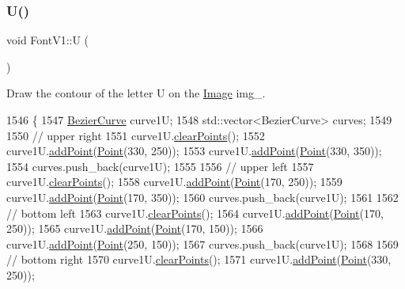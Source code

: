 \subsubsection{\texorpdfstring{U()}{U()}}
{\footnotesize\ttfamily void Font\+V1\+::U (\begin{DoxyParamCaption}{ }\end{DoxyParamCaption})}



Draw the contour of the letter U on the \mbox{\hyperlink{class_image}{Image}} img\+\_\+. 


\begin{DoxyCode}
1546                \{
1547     \mbox{\hyperlink{class_bezier_curve}{BezierCurve}} curve1U;
1548     std::vector<BezierCurve> curves;
1549 
1550     \textcolor{comment}{// upper right}
1551     curve1U.\mbox{\hyperlink{class_bezier_curve_a0ba8ce66d5af5971ae6a1b506029728e}{clearPoints}}();
1552     curve1U.\mbox{\hyperlink{class_bezier_curve_a38d16c18b36ae45619b05e26e226cf34}{addPoint}}(\mbox{\hyperlink{class_point}{Point}}(330, 250));
1553     curve1U.\mbox{\hyperlink{class_bezier_curve_a38d16c18b36ae45619b05e26e226cf34}{addPoint}}(\mbox{\hyperlink{class_point}{Point}}(330, 350));
1554     curves.push\_back(curve1U);
1555 
1556     \textcolor{comment}{// upper left}
1557     curve1U.\mbox{\hyperlink{class_bezier_curve_a0ba8ce66d5af5971ae6a1b506029728e}{clearPoints}}();
1558     curve1U.\mbox{\hyperlink{class_bezier_curve_a38d16c18b36ae45619b05e26e226cf34}{addPoint}}(\mbox{\hyperlink{class_point}{Point}}(170, 250));
1559     curve1U.\mbox{\hyperlink{class_bezier_curve_a38d16c18b36ae45619b05e26e226cf34}{addPoint}}(\mbox{\hyperlink{class_point}{Point}}(170, 350));
1560     curves.push\_back(curve1U);
1561 
1562     \textcolor{comment}{// bottom left}
1563     curve1U.\mbox{\hyperlink{class_bezier_curve_a0ba8ce66d5af5971ae6a1b506029728e}{clearPoints}}();
1564     curve1U.\mbox{\hyperlink{class_bezier_curve_a38d16c18b36ae45619b05e26e226cf34}{addPoint}}(\mbox{\hyperlink{class_point}{Point}}(170, 250));
1565     curve1U.\mbox{\hyperlink{class_bezier_curve_a38d16c18b36ae45619b05e26e226cf34}{addPoint}}(\mbox{\hyperlink{class_point}{Point}}(170, 150));
1566     curve1U.\mbox{\hyperlink{class_bezier_curve_a38d16c18b36ae45619b05e26e226cf34}{addPoint}}(\mbox{\hyperlink{class_point}{Point}}(250, 150));
1567     curves.push\_back(curve1U);
1568 
1569     \textcolor{comment}{// bottom right}
1570     curve1U.\mbox{\hyperlink{class_bezier_curve_a0ba8ce66d5af5971ae6a1b506029728e}{clearPoints}}();
1571     curve1U.\mbox{\hyperlink{class_bezier_curve_a38d16c18b36ae45619b05e26e226cf34}{addPoint}}(\mbox{\hyperlink{class_point}{Point}}(330, 250));

\end{DoxyCode}
